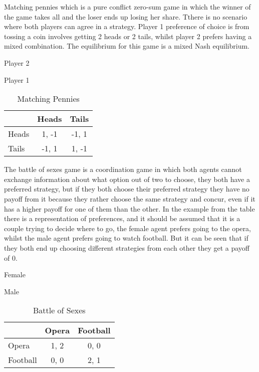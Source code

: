 Matching pennies which is a pure conflict zero-sum game in which the winner of the game takes all and the loser ends up losing her share. Tthere is no scenario where both players can agree in a strategy. Player 1 preference of choice is from tossing a coin involves getting 2 heads or 2 tails, whilst player 2 prefers having a mixed combination.  The equilibrium for this game is a mixed Nash equilibrium.

\begin{table}[h]
\begin{center}
Player 2


Player 1
\begin{tabular}{|l|c|c|}
\hline
 & Heads & Tails \\ 
\hline
Heads & 1, -1 & -1, 1\\
\hline
 Tails & -1, 1 & 1, -1\\
\hline
\end{tabular}
\end{center}
\caption{Matching Pennies}
\label{tab:matpentag}
\end{table}


The battle of sexes game is a coordination game in which both agents cannot exchange information about what option out of two to choose, they both have a preferred strategy, but if they both choose their preferred strategy they have no payoff from it because they rather choose the same strategy and concur,  even if it has a higher payoff for one of them than the other. In the example from the table there is a representation of preferences, and it should be assumed that it is a couple trying to decide where to go, the female agent prefers going to the opera, whilst the male agent prefers going to watch football. But it can be seen that if they both end up choosing different strategies from each other they get a payoff of 0. 

\begin{table}[h]
\begin{center}
Female


Male
\begin{tabular}{|l|c|c|}
\hline
 & Opera & Football \\ 
\hline
Opera & 1, 2 & 0, 0\\
\hline
 Football & 0, 0 & 2, 1\\
\hline
\end{tabular}
\end{center}
\caption{Battle of Sexes}
\label{tab:bostag}
\end{table}

